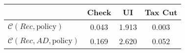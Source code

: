 \begin{tabular}{@{}lccc@{}}
\toprule
                          & Check      & UI    & Tax Cut    \\  \midrule
$\mathcal{C}(Rec,\text{policy})$ & 0.043  & 1.913  & 0.003     \\
$\mathcal{C}(Rec, AD,\text{policy})$ & 0.169  & 2.620  & 0.052     \\
\end{tabular}
